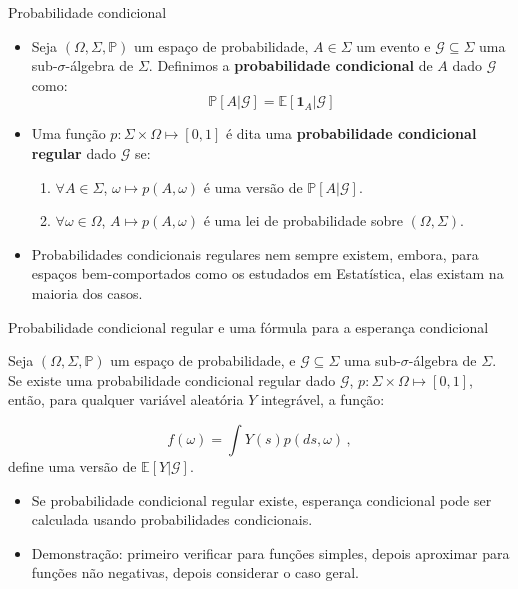 \documentclass[11pt]{beamer}
\begin{document}
		\begin{frame}{Probabilidade condicional}
\begin{itemize}
	\item Seja $(\Omega, \Sigma,\mathbb{P})$ um espaço de probabilidade, $A \in \Sigma$ um evento e $\mathcal{G}\subseteq \Sigma$ uma sub-$\sigma$-álgebra de $\Sigma$. Definimos a \textbf{probabilidade condicional} de $A$ dado $\mathcal{G}$ como:
	$$\mathbb{P}[A|\mathcal{G}] = \mathbb{E}[\mathbf{1}_{A}|\mathcal{G}]$$
\item Uma função $p: \Sigma \times \Omega \mapsto [0,1]$ é dita uma \textbf{probabilidade condicional regular}  dado $\mathcal{G}$ se:
\begin{enumerate}
	\item $\forall A \in \Sigma$, $\omega \mapsto p(A,\omega)$ é uma versão de $\mathbb{P}[A|\mathcal{G}]$.
	\item $\forall \omega \in \Omega$, $A \mapsto p(A, \omega)$ é uma lei de probabilidade sobre $(\Omega, \Sigma)$.
\end{enumerate}
\item Probabilidades condicionais regulares nem sempre existem, embora, para espaços bem-comportados como os estudados em Estatística, elas existam na maioria dos casos.
\end{itemize}
\end{frame}

\begin{frame}{Probabilidade condicional regular e uma fórmula para a esperança condicional}
\begin{lemma}
	Seja $(\Omega, \Sigma,\mathbb{P})$ um espaço de probabilidade, e $\mathcal{G}\subseteq \Sigma$ uma sub-$\sigma$-álgebra de $\Sigma$. Se existe uma probabilidade condicional regular dado $\mathcal{G}$, $p:\Sigma\times \Omega \mapsto {[0,1]}$, então, para qualquer variável aleatória $Y$ integrável, a função:
	
	$$f(\omega) = \int Y(s) p(ds, \omega)\, , $$
	define uma versão de $\mathbb{E}[Y|\mathcal{G}]$.
\end{lemma}
\begin{itemize}
	\item Se probabilidade condicional regular existe, esperança condicional pode ser calculada usando probabilidades condicionais.
	\item Demonstração: primeiro verificar para funções simples, depois aproximar para funções não negativas, depois considerar o caso geral.
\end{itemize}
\end{frame}
\end{document}
